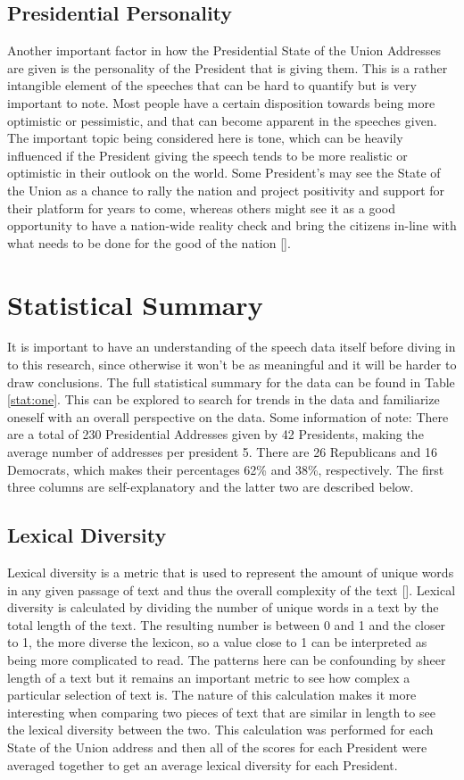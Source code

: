 \subsection{Presidential Personality}
Another important factor in how the Presidential State of the Union Addresses are given is the personality of the President that is giving them.
This is a rather intangible element of the speeches that can be hard to quantify but is very important to note.
Most people have a certain disposition towards being more optimistic or pessimistic, and that can become apparent in the speeches given.
The important topic being considered here is tone, which can be heavily influenced if the President giving the speech tends to be more realistic or optimistic in their outlook on the world.
Some President's may see the State of the Union as a chance to rally the nation and project positivity and support for their platform for years to come, whereas others might see it as a good opportunity to have a nation-wide reality check and bring the citizens in-line with what needs to be done for the good of the nation [\cite{teten2003evolution}].

\section{Statistical Summary}
It is important to have an understanding of the speech data itself before diving in to this research, since otherwise it won't be as meaningful and it will be harder to draw conclusions.
The full statistical summary for the data can be found in Table \ref{stat:one}.
This can be explored to search for trends in the data and familiarize oneself with an overall perspective on the data.
Some information of note: 
There are a total of 230 Presidential Addresses given by 42 Presidents, making the average number of addresses per president 5. 
There are 26 Republicans and 16 Democrats, which makes their percentages 62\% and 38\%, respectively.
The first three columns are self-explanatory and the latter two are described below.

\subsection{Lexical Diversity}
Lexical diversity is a metric that is used to represent the amount of unique words in any given passage of text and thus the overall complexity of the text [\cite{johansson2009lexical}].
Lexical diversity is calculated by dividing the number of unique words in a text by the total length of the text.
The resulting number is between 0 and 1 and the closer to 1, the more diverse the lexicon, so a value close to 1 can be interpreted as being more complicated to read.
The patterns here can be confounding by sheer length of a text but it remains an important metric to see how complex a particular selection of text is.
The nature of this calculation makes it more interesting when comparing two pieces of text that are similar in length to see the lexical diversity between the two.
This calculation was performed for each State of the Union address and then all of the scores for each President were averaged together to get an average lexical diversity for each President.

